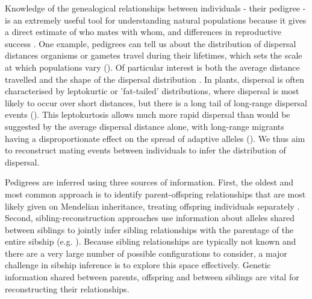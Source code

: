 \documentclass[10pt, a4paper, twocolumn]{article} %
\begin{document}
Knowledge of the genealogical relationships between individuals - their pedigree - is an extremely useful tool for understanding natural populations because it gives a direct estimate of who mates with whom, and differences in reproductive success \citep{thompson1976inference, pemberton2008wild}.
One example, pedigrees can tell us about the distribution of dispersal distances organisms or gametes travel during their lifetimes, which sets the scale at which populations vary (\cite{cain2000long, kremer2012long}).
Of particular interest is both the average distance travelled and the shape of the dispersal distribution \citep{cain2000long, nathan2012dispersal}.
In plants, dispersal is often characterised by leptokurtic or 'fat-tailed' distributions, where dispersal is most likely to occur over short distances, but there is a long tail of long-range dispersal events (\cite{clark1998trees,austerlitz2004using,bullock2017synthesis}).
This leptokurtosis allows much more rapid dispersal than would be suggested by the average dispersal distance alone, with long-range migrants having a disproportionate effect on the spread of adaptive alleles (\cite{clark1998trees,cain2000long}).
We thus aim to reconstruct mating events between individuals to infer the distribution of dispersal.

Pedigrees are inferred using three sources of information.
First, the oldest and most common approach is to identify parent-offspring relationships that are most likely given on Mendelian inheritance, treating offspring individuals separately \citep{thompson1976inference, meagher1986analysis, marshall1998statistical}.
Second, sibling-reconstruction approaches use information about alleles shared between siblings to jointly infer sibling relationships with the parentage of the entire sibship (e.g. \cite{thompson1987parental, emery2001assignment, thomas2002sibship, jones2007estimating, wang2004sibship, anderson2016bayesian, huisman2017pedigree}).
Because sibling relationships are typically not known and there are a very large number of possible configurations to consider, a major challenge in sibship inference is to explore this space effectively.
Genetic information shared between parents, offspring and between siblings are vital for reconstructing their relationships.
\end{document}
